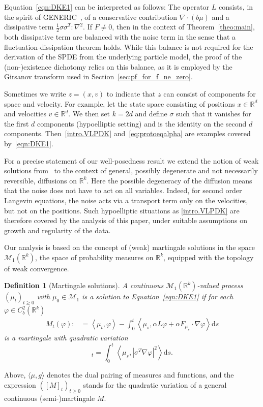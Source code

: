 \documentclass{article}
\newcommand{\dd}{\text{d}}
\newcommand{\av}[1]{\left<#1\right>}
\newtheorem{definition}[theorem]{Definition}
\newcommand{\R}{\mathbb{R}}
\newcommand{\F}{F}
\newcommand{\cM}{\mathcal M}
\begin{document}
Equation~\eqref{eqn:DKE1} can be interpreted as follows: The operator $L$ consists, in the spirit of
GENERIC~\cite{Ottinger2005a}, of a conservative contribution $\nabla \cdot (b \mu)$ and a dissipative term
$\frac{1}{2}\sigma \sigma^T :\nabla^2$.  If $\F \neq 0$, then in the context of Theorem~\ref{theo:main}, both
dissipative term are balanced with the noise term in the sense that a fluctuation-dissipation theorem
holds. While this balance is not required for the derivation of the SPDE from the underlying particle model,
the proof of the (non-)existence dichotomy relies on this balance, as it is employed by the Girsanov transform
used in Section~\ref{sec:pf_for_f_ne_zero}.

Sometimes we write $z = (x,v)$ to indicate that $z$ can consist of components for space and velocity. For
example, let the state space consisting of positions $x \in \R^d$ and velocities $v\in \R^d$. We then set
$k = 2d$ and define $\sigma$ such that it vanishes for the first $d$ components (hypoelliptic setting) and is
the identity on the second $d$ components. Then~\eqref{intro.VLPDK} and~\eqref{eq:protoeqalpha} are examples
covered by~\eqref{eqn:DKE1}.


For a precise statement of our well-posedness result we extend the notion of weak solutions
from~\cite{Konarovskyi2019a} to the context of general, possibly degenerate and not necessarily reversible,
diffusions on $\R^k$. Here the possible degeneracy of the diffusion means that the noise does not have to act
on all variables. Indeed, for second order Langevin equations, the noise acts via a transport term only on the
velocities, but not on the positions. Such hypoelliptic situations as \eqref{intro.VLPDK} are therefore
covered by the analysis of this paper, under suitable assumptions on growth and regularity of the data.

Our analysis is based on the concept of (weak) martingale solutions in the space $\mathcal{M}_1(\R^k)$, the
space of probability measures on $\R^k$, equipped with the topology of weak convergence.

\begin{definition}[Martingale solutions]
  \label{def:martsol}
  A continuous $\mathcal M_1(\R^k)$-valued process $(\mu_t)_{t \geq 0}$ with $\mu_0 \in \cM_1$ is a \emph{solution} to
  Equation~\eqref{eqn:DKE1} if for each $\varphi \in C_b^2 (\R^k)$
  \begin{align*}
	M_t(\varphi) :&=  \av{\mu_t, \varphi} - \int_0^t 
                        \av{\mu_s, \alpha L \varphi + \alpha F_{\mu_s} \cdot \nabla \varphi} \dd s
  \end{align*}
  is a martingale with quadratic variation
  \begin{equation*}
    [M_\cdot(\varphi)]_t = \int_0^t \av{\mu_s, |\sigma^T \nabla \varphi|^2} \dd s.
  \end{equation*}
  \label{def:solutions}
\end{definition}
Above, $\langle \mu, g\rangle$ denotes the dual pairing of measures and functions, and the expression
$([M]_t)_{t \geq 0}$ stands for the quadratic variation of a general continuous (semi-)martingale $M$.
\end{document}
